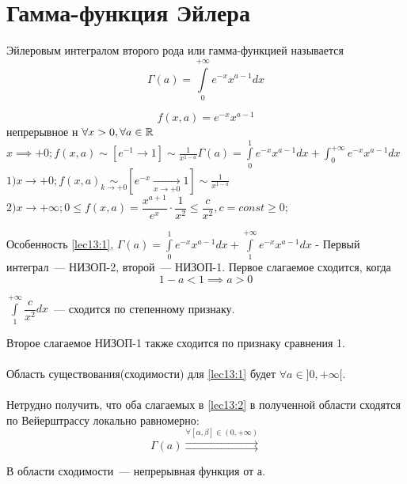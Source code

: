 \documentclass[../../main.tex]{subfiles}
\begin{document}

\section{Гамма-функция Эйлера}

Эйлеровым интегралом второго рода или гамма-функцией называется
\begin{equation}
\label{lec13:1}
\Gamma(a) = \int\limits_0^{+\infty}e^{-x}x^{a-1}dx
\end{equation}

\[
	f(x, a) = e^{-x}x^{a-1}
\]  непрерывное н $\forall x > 0, \forall a \in \mathbb{R}$
\\
$
	x \implies +0; f(x, a) \sim [e^{-1} \to 1] \sim \frac{1}{x^{1-a}}
	\Gamma(a) = \int\limits_0^1e^{-x}x^{a-1}dx + \int_0^{+\infty}e^{-x}x^{a-1}dx
$
\\
$
1) x \to + 0; f(x, a) \underset{k \to +0}\sim \left[ e^{-x} 
\underset{x \to +0} \to 1 \right] \sim \frac{1}{x^{1-a}}
$
\\
$
	2) x \to +\infty; 
	0 \le f(x, a) = \dfrac{x^{a+1}}{e^x} \cdot \dfrac{1}{x^2} \le \dfrac{c}{x^2}, 
	c=const \ge 0;
$

Особенность \eqref{lec13:1}, $\Gamma(a) = \int\limits_0^1 e^{-x} x^{a-1} dx +
\int\limits_1^{+\infty} e^{-x} x^{a-1} dx $ - 
Первый интеграл~--- НИЗОП-2, второй~--- НИЗОП-1. 
Первое слагаемое сходится, когда \begin{equation}
	\label{lec13:2}
	1 - a < 1 \implies a > 0
\end{equation}

$\int\limits_1^{+\infty}\dfrac{c}{x^2}dx$~--- сходится по степенному признаку.

Второе слагаемое НИЗОП-1 также сходится по признаку сравнения 1.
\\\\
Область существования(сходимости) для \eqref{lec13:1} будет $\forall a \in ]0, 
+\infty[$.
\\\\
Нетрудно получить, что оба слагаемых в \eqref{lec13:2} в полученной области 
сходятся по Вейерштрассу локально равномерно:
\[
\Gamma(a) \overset{\forall \left[ \alpha, \beta \right] \in (0, 
+\infty)}{\rightrightarrows}
\]

В области сходимости~--- непрерывная функция от а.
\end{document}
